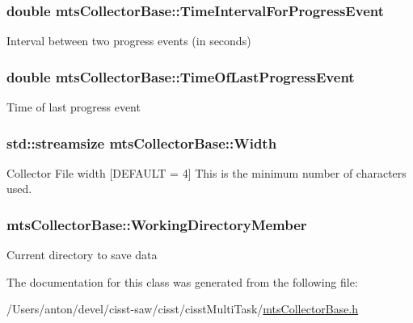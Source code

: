 \subsubsection[{Time\+Interval\+For\+Progress\+Event}]{\setlength{\rightskip}{0pt plus 5cm}double mts\+Collector\+Base\+::\+Time\+Interval\+For\+Progress\+Event\hspace{0.3cm}{\ttfamily [protected]}}\label{classmts_collector_base_ab6c33b31e4651991098cd0963a575d24}
Interval between two progress events (in seconds) \hypertarget{classmts_collector_base_aa33295c29dd9bc683cb95a9f57c5a09e}{}
\subsubsection[{Time\+Of\+Last\+Progress\+Event}]{\setlength{\rightskip}{0pt plus 5cm}double mts\+Collector\+Base\+::\+Time\+Of\+Last\+Progress\+Event\hspace{0.3cm}{\ttfamily [protected]}}\label{classmts_collector_base_aa33295c29dd9bc683cb95a9f57c5a09e}
Time of last progress event \hypertarget{classmts_collector_base_add0435d1bd0dfaed9f54bc82831ca3ea}{}
\subsubsection[{Width}]{\setlength{\rightskip}{0pt plus 5cm}std\+::streamsize mts\+Collector\+Base\+::\+Width\hspace{0.3cm}{\ttfamily [protected]}}\label{classmts_collector_base_add0435d1bd0dfaed9f54bc82831ca3ea}
Collector File width \mbox{[}D\+E\+F\+A\+U\+L\+T = 4\mbox{]} This is the minimum number of characters used. \hypertarget{classmts_collector_base_a1af964c915eb2090cc72a8515dcbea6d}{}
\subsubsection[{Working\+Directory\+Member}]{ mts\+Collector\+Base\+::\+Working\+Directory\+Member\hspace{0.3cm}{\ttfamily [protected]}}\label{classmts_collector_base_a1af964c915eb2090cc72a8515dcbea6d}
Current directory to save data 

The documentation for this class was generated from the following file\+:\begin{DoxyCompactItemize}
\item 
/\+Users/anton/devel/cisst-\/saw/cisst/cisst\+Multi\+Task/\hyperlink{mts_collector_base_8h}{mts\+Collector\+Base.\+h}\end{DoxyCompactItemize}
